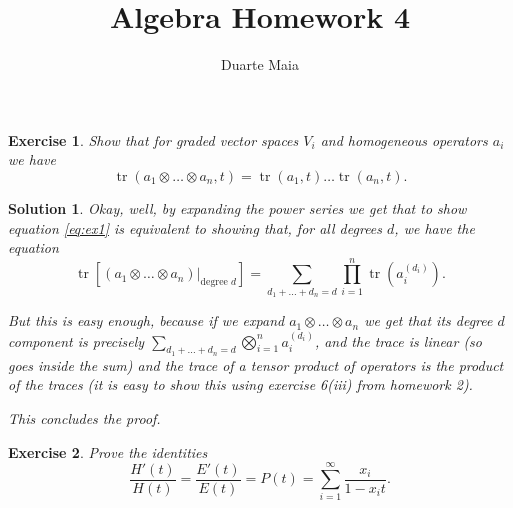 \documentclass{article}
\title{Algebra Homework 4}
\author{Duarte Maia}
\newtheorem{ex}{Exercise}
\theoremstyle{nonumberplain}
\newtheorem{sol}{Solution}
\DeclareMathOperator{\trace}{tr}
\begin{document}
\maketitle

\begin{ex}
Show that for graded vector spaces $V_i$ and homogeneous operators $a_i$ we have
\begin{equation}\label{eq:ex1}
\trace(a_1 \otimes \dots \otimes a_n, t) = \trace(a_1, t) \dots \trace(a_n, t).
\end{equation}
\end{ex}

\begin{sol}
Okay, well, by expanding the power series we get that to show equation \eqref{eq:ex1} is equivalent to showing that, for all degrees $d$, we have the equation
\begin{equation}
\trace\left[ (a_1 \otimes \dots \otimes a_n)|_{\text{degree $d$}} \right] = \sum_{d_1 + \dots + d_n = d} \prod_{i=1}^n \trace(a_i^{(d_i)}).
\end{equation}

But this is easy enough, because if we expand $a_1 \otimes \dots \otimes a_n$ we get that its degree $d$ component is precisely $\sum_{d_1 + \dots + d_n = d} \bigotimes_{i=1}^n a_i^{(d_i)}$, and the trace is linear (so goes inside the sum) and the trace of a tensor product of operators is the product of the traces (it is easy to show this using exercise 6(iii) from homework 2).

This concludes the proof.
\end{sol}

\setcounter{ex}{2}

\begin{ex}
Prove the identities
\begin{equation}
\frac{H'(t)}{H(t)} = \frac{E'(t)}{E(t)} = P(t) = \sum_{i=1}^\infty \frac{x_i}{1-x_i t}.
\end{equation}
\end{ex}
\end{document}
